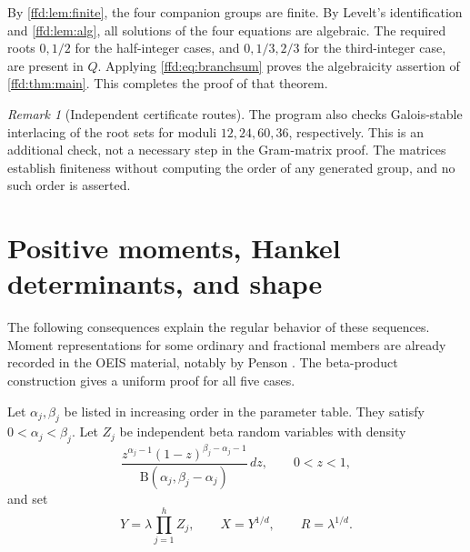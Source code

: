 \documentclass[11pt]{article}
\theoremstyle{definition}
\theoremstyle{remark}
\newtheorem{remark}[theorem]{Remark}
\begin{document}
By \cref{ffd:lem:finite}, the four companion groups are finite. By Levelt's
identification and \cref{ffd:lem:alg}, all solutions of the four equations are
algebraic. The required roots $0,1/2$ for the half-integer cases, and
$0,1/3,2/3$ for the third-integer case, are present in $Q$. Applying
\eqref{ffd:eq:branchsum} proves the algebraicity assertion of \cref{ffd:thm:main}.
This completes the proof of that theorem.

\begin{remark}[Independent certificate routes]
The program also checks Galois-stable interlacing of the root sets for moduli
$12,24,60,36$, respectively. This is an additional check, not a necessary
step in the Gram-matrix proof. The matrices establish finiteness without
computing the order of any generated group, and no such order is asserted.
\end{remark}

\section{Positive moments, Hankel determinants, and shape}\label{ffd:sec:moments}
The following consequences explain the regular behavior of these sequences.
Moment representations for some ordinary and fractional members are already
recorded in the OEIS material, notably by Penson \cite{ffd-oeis431,ffd-oeis854}.
The beta-product construction gives a uniform proof for all five cases.

Let $\alpha_j,\beta_j$ be listed in increasing order in the parameter table.
They satisfy $0<\alpha_j<\beta_j$. Let $Z_j$ be independent beta random
variables with density
\begin{equation}
 \frac{z^{\alpha_j-1}(1-z)^{\beta_j-\alpha_j-1}}
 {\mathrm B(\alpha_j,\beta_j-\alpha_j)}\,dz,
 \qquad 0<z<1,
 \label{ffd:eq:beta}
\end{equation}
and set
\begin{equation}
 Y=\lambda\prod_{j=1}^h Z_j,\qquad X=Y^{1/d},\qquad R=\lambda^{1/d}.
 \label{ffd:eq:randomX}
\end{equation}
\end{document}
